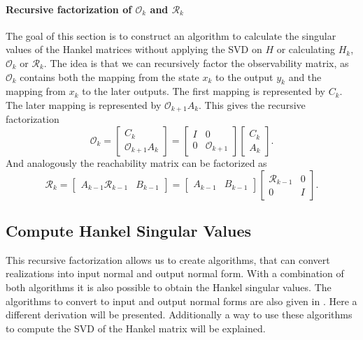 \documentclass[doctype=mastersthesis,BCOR=15mm,biblatex]{ldvbook}%
\newcommand{\R}{\mathcal{R}} %
\newcommand{\Ob}{\mathcal{O}} %
\newcommand{\eye}{I} %
\begin{document}
\paragraph{Recursive factorization of $\Ob_k$ and  $\R_k$}
The goal of this section is to construct an algorithm to calculate the singular values of the Hankel matrices without applying the SVD on $H$ or calculating $H_k$, $\Ob_k$ or $\R_k$.
The idea is that we can recursively factor the observability matrix, as $\Ob_k$ contains both the mapping from the state $x_k$ to the output $y_k$ and the mapping from $x_k$ to the later outputs.
The first mapping is represented by $C_k$.
The later mapping is represented by $\Ob_{k+1}A_k$.
This gives the recursive factorization
\begin{equation}\label{eq:decomp_O}
	\Ob_k = 
	\begin{bmatrix}
	C_k\\
	\Ob_{k+1}A_k
	\end{bmatrix}
	=
	\begin{bmatrix}
	\eye& 0 \\
	0& \Ob_{k+1}
	\end{bmatrix}
	\begin{bmatrix}
	C_k\\
	A_k
	\end{bmatrix}
	.
\end{equation}
And analogously the reachability matrix can be factorized as
\begin{equation}\label{eq:decomp_R}
	\R_k = 
	\begin{bmatrix}
	A_{k-1} \R_{k-1} & B_{k-1}
	\end{bmatrix}
	=
	\begin{bmatrix}
	A_{k-1} & B_{k-1}
	\end{bmatrix}
	\begin{bmatrix}
	\R_{k-1} &0\\
	0& \eye
	\end{bmatrix}
	.
\end{equation}

\subsection{Compute Hankel Singular Values}
This recursive factorization allows us to create algorithms, that can convert realizations into input normal and output normal form.
With a combination of both algorithms it is also possible to obtain the Hankel singular values.
The algorithms to convert to input and output normal forms are also given in \cite{chandrasekaran_fast_2005}.
Here a different derivation will be presented. Additionally a way to use these algorithms to compute the SVD of the Hankel matrix will be explained. 
\end{document}
